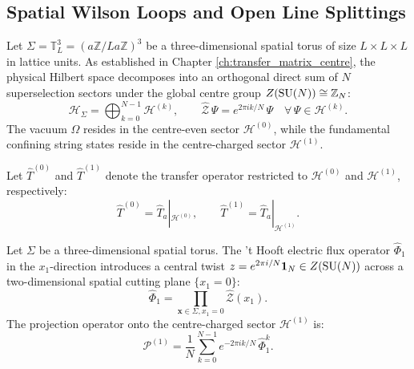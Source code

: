 \subsection{Spatial Wilson Loops and Open Line Splittings}
\label{subsec:open_line_splittings}

Let $\Sigma = \mathbb{T}_L^3 = (a \mathbb{Z} / L a \mathbb{Z})^3$ be a three-dimensional spatial torus of size $L \times L \times L$ in lattice units. As established in Chapter \ref{ch:transfer_matrix_centre}, the physical Hilbert space decomposes into an orthogonal direct sum of $N$ superselection sectors under the global centre group $Z(\mathrm{SU}(N)) \cong \mathbb{Z}_N$:
\begin{equation}
\label{eq:ch11_centre_grading}
\mathcal{H}_\Sigma = \bigoplus_{k=0}^{N-1} \mathcal{H}^{(k)}, \qquad \hat{\mathcal{Z}} \, \Psi = e^{2\pi i k / N} \, \Psi \quad \forall \, \Psi \in \mathcal{H}^{(k)}.
\end{equation}
The vacuum $\Omega$ resides in the centre-even sector $\mathcal{H}^{(0)}$, while the fundamental confining string states reside in the centre-charged sector $\mathcal{H}^{(1)}$.

Let $\hat{T}^{(0)}$ and $\hat{T}^{(1)}$ denote the transfer operator restricted to $\mathcal{H}^{(0)}$ and $\mathcal{H}^{(1)}$, respectively:
\begin{equation}
\hat{T}^{(0)} = \hat{T}_a|_{\mathcal{H}^{(0)}}, \qquad \hat{T}^{(1)} = \hat{T}_a|_{\mathcal{H}^{(1)}}.
\end{equation}

\begin{definition}
\label{def:thooft_electric_flux}
Let $\Sigma$ be a three-dimensional spatial torus. The 't Hooft electric flux operator $\hat{\Phi}_1$ in the $x_1$-direction introduces a central twist $z = e^{2\pi i / N} \mathbf{1}_N \in Z(\mathrm{SU}(N))$ across a two-dimensional spatial cutting plane $\{x_1 = 0\}$:
\begin{equation}
\label{eq:ch11_thooft_flux_operator}
\hat{\Phi}_1 = \prod_{\mathbf{x} \in \Sigma, x_1 = 0} \hat{\mathcal{Z}}(x_1).
\end{equation}
The projection operator onto the centre-charged sector $\mathcal{H}^{(1)}$ is:
\begin{equation}
\label{eq:ch11_p1_projector}
\mathcal{P}^{(1)} = \frac{1}{N} \sum_{k=0}^{N-1} e^{-2\pi i k / N} \, \hat{\Phi}_1^k.
\end{equation}
\end{definition}


